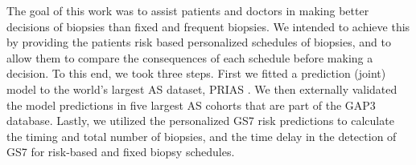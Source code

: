 The goal of this work was to assist patients and doctors in making better decisions of biopsies than fixed and frequent biopsies. We intended to achieve this by providing the patients risk based personalized schedules of biopsies, and to allow them to compare the consequences of each schedule before making a decision. To this end, we took three steps. First we fitted a prediction (joint) model to the world's largest AS dataset, PRIAS \citep{bul2013active}. We then externally validated the model predictions in five largest AS cohorts that are part of the GAP3 database. Lastly, we utilized the personalized GS7 risk predictions to calculate the timing and total number of biopsies, and the time delay in the detection of GS7 for risk-based and fixed biopsy schedules.